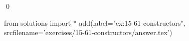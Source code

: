 
\begin{ex}
  \label{ex:15-61-constructors}
  
  \qed
\end{ex}
\begin{python0}
from solutions import *
add(label="ex:15-61-constructors",
    srcfilename='exercises/15-61-constructors/answer.tex')
\end{python0}
